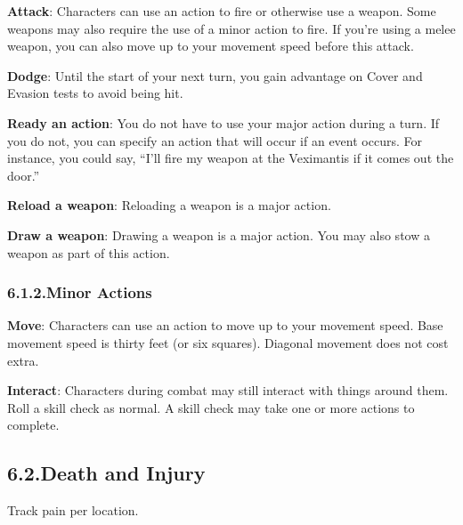 \documentclass{article}
\begin{document}
\noindent{}\textbf{Attack}: Characters can use an action to fire or otherwise use a weapon. Some weapons may also require the use of a minor action to fire. 
If you’re using a melee weapon, you can also move up to your movement speed before this attack.%

\textbf{Dodge}: Until the start of your next turn, you gain advantage on Cover and Evasion tests to avoid being hit.%

\textbf{Ready an action}: You do not have to use your major action during a turn. If you do not, you can specify an action that will occur if an event occurs. For instance, you could say, “I’ll fire my weapon at the Veximantis if it comes out the door.”%

\textbf{Reload a weapon}: Reloading a weapon is a major action.%

\textbf{Draw a weapon}: Drawing a weapon is a major action. You may also stow a weapon as part of this action.%

\subsubsection{6.1.2.\hspace*{0.5em}Minor Actions}\label{sec-minor-actions}%

\noindent{}\textbf{Move}: Characters can use an action to move up to your movement speed. Base movement speed is thirty feet (or six squares). Diagonal movement does not cost extra.%

\textbf{Interact}: Characters during combat may still interact with things around them. Roll a skill check as normal. A skill check may take one or more actions to complete.%

\subsection{6.2.\hspace*{0.5em}Death and Injury}\label{sec-death-and-injury}%

\noindent{}Track pain per location.%
\end{document}
